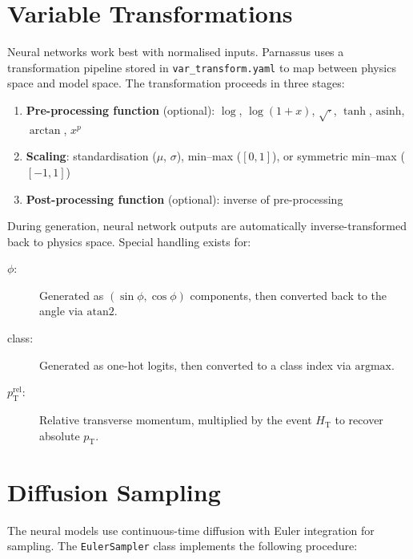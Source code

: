 \documentclass[11pt,a4paper]{article}
\begin{document}
\appendix

\section{Variable Transformations}
\label{app:transforms}

Neural networks work best with normalised inputs. Parnassus uses a transformation
pipeline stored in \texttt{var\_transform.yaml} to map between physics space and
model space. The transformation proceeds in three stages:

\begin{enumerate}
  \item \textbf{Pre-processing function} (optional): $\log$, $\log(1+x)$,
    $\sqrt{\cdot}$, $\tanh$, $\mathrm{asinh}$, $\arctan$, $x^p$
  \item \textbf{Scaling}: standardisation ($\mu$, $\sigma$), min--max ($[0,1]$),
    or symmetric min--max ($[-1,1]$)
  \item \textbf{Post-processing function} (optional): inverse of pre-processing
\end{enumerate}

\noindent
During generation, neural network outputs are automatically inverse-transformed back
to physics space. Special handling exists for:

\begin{description}
  \item[$\phi$:] Generated as $(\sin\phi, \cos\phi)$ components, then converted back
    to the angle via $\mathrm{atan2}$.
  \item[class:] Generated as one-hot logits, then converted to a class index via
    $\mathrm{argmax}$.
  \item[$p_\mathrm{T}^\mathrm{rel}$:] Relative transverse momentum, multiplied by
    the event $H_\mathrm{T}$ to recover absolute $p_\mathrm{T}$.
\end{description}

\section{Diffusion Sampling}
\label{app:diffusion}

The neural models use continuous-time diffusion with Euler integration for sampling.
The \texttt{EulerSampler} class implements the following procedure:
\end{document}
